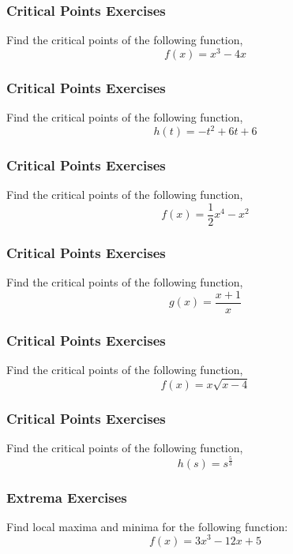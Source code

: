 \documentclass[xcolor=dvipsnames]{beamer}
\begin{document}
\begin{frame}
  \frametitle{Critical Points Exercises}
{\ubung} Find the critical points of the following function,
\begin{equation}
  \label{eq:xoongohh}
f(x)=x^{3}-4x
\end{equation}
\end{frame}

\begin{frame}
  \frametitle{Critical Points Exercises}
{\ubung} Find the critical points of the following function,
\begin{equation}
  \label{eq:aghuomoh}
h(t)=-t^{2}+6t+6
\end{equation}
\end{frame}

\begin{frame}
  \frametitle{Critical Points Exercises}
{\ubung} Find the critical points of the following function,
\begin{equation}
  \label{eq:yakovuap}
f(x)=\frac{1}{2}x^{4}-x^{2}
\end{equation}
\end{frame}

\begin{frame}
  \frametitle{Critical Points Exercises}
{\ubung} Find the critical points of the following function,
\begin{equation}
  \label{eq:aweefahx}
g(x)=\frac{x+1}{x}
\end{equation}
\end{frame}

\begin{frame}
  \frametitle{Critical Points Exercises}
{\ubung} Find the critical points of the following function,
\begin{equation}
  \label{eq:ebukatio}
f(x)=x\sqrt{x-4}
\end{equation}
\end{frame}

\begin{frame}
  \frametitle{Critical Points Exercises}
{\ubung} Find the critical points of the following function,
\begin{equation}
  \label{eq:inaidimo}
h(s)=s^{\frac{5}{3}}
\end{equation}
\end{frame}

\begin{frame}
  \frametitle{Extrema Exercises}
{\ubung} Find local maxima and minima for the following function:
\begin{equation}
  \label{eq:xxyxx1}
f(x)=3x^{3}-12x+5
\end{equation}
\end{frame}
\end{document}
